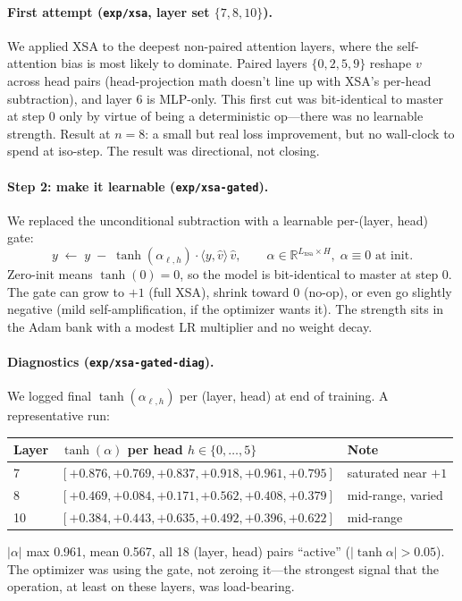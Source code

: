 \documentclass[10pt,letterpaper]{article}
\newcommand{\code}[1]{\texttt{\small #1}}
\begin{document}
\paragraph{First attempt (\code{exp/xsa}, layer set $\{7,8,10\}$).} We applied XSA to the deepest non-paired attention layers, where the self-attention bias is most likely to dominate. Paired layers $\{0,2,5,9\}$ reshape $v$ across head pairs (head-projection math doesn't line up with XSA's per-head subtraction), and layer 6 is MLP-only. This first cut was bit-identical to master at step 0 only by virtue of being a deterministic op---there was no learnable strength. Result at $n=8$: a small but real loss improvement, but no wall-clock to spend at iso-step. The result was directional, not closing.

\paragraph{Step 2: make it learnable (\code{exp/xsa-gated}).} We replaced the unconditional subtraction with a learnable per-(layer, head) gate:
\[
  y \;\leftarrow\; y \;-\; \tanh(\alpha_{\ell,h}) \cdot \langle y, \hat{v}\rangle\, \hat{v},
  \qquad \alpha \in \mathbb{R}^{L_{\text{xsa}} \times H},\; \alpha\!\equiv\!0 \text{ at init}.
\]
Zero-init means $\tanh(0)=0$, so the model is bit-identical to master at step 0. The gate can grow to $+1$ (full XSA), shrink toward $0$ (no-op), or even go slightly negative (mild self-amplification, if the optimizer wants it). The strength sits in the Adam bank with a modest LR multiplier and no weight decay.

\paragraph{Diagnostics (\code{exp/xsa-gated-diag}).} We logged final $\tanh(\alpha_{\ell,h})$ per (layer, head) at end of training. A representative run:
\begin{center}\small
\begin{tabular}{lll}
\toprule
Layer & $\tanh(\alpha)$ per head $h\in\{0,\dots,5\}$ & Note \\
\midrule
7  & $[+0.876, +0.769, +0.837, +0.918, +0.961, +0.795]$ & saturated near $+1$ \\
8  & $[+0.469, +0.084, +0.171, +0.562, +0.408, +0.379]$ & mid-range, varied \\
10 & $[+0.384, +0.443, +0.635, +0.492, +0.396, +0.622]$ & mid-range \\
\bottomrule
\end{tabular}
\end{center}
$|\alpha|$ max 0.961, mean 0.567, all 18 (layer, head) pairs ``active'' ($|\tanh\alpha| > 0.05$). The optimizer was using the gate, not zeroing it---the strongest signal that the operation, at least on these layers, was load-bearing.
\end{document}
